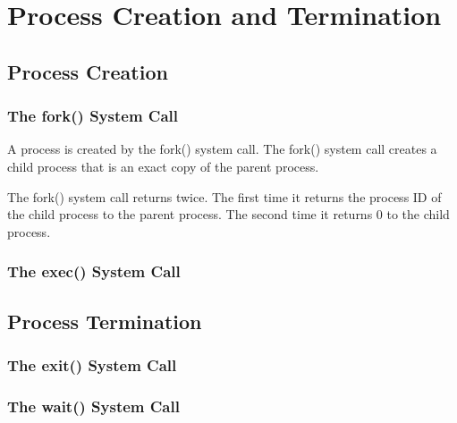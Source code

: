\section{Process Creation and Termination}
\label{sec:process-creation-and-termination}

\subsection{Process Creation}
\label{sec:process-creation}

\subsubsection{The fork() System Call}
\label{sec:the-fork-system-call}

A process is created by the fork() system call.
The fork() system call creates a child process that is an exact copy of the parent process.

The fork() system call returns twice.
The first time it returns the process ID of the child process to the parent process.
The second time it returns 0 to the child process.

\subsubsection{The exec() System Call}
\label{sec:the-exec-system-call}

\subsection{Process Termination}
\label{sec:process-termination}

\subsubsection{The exit() System Call}
\label{sec:the-exit-system-call}

\subsubsection{The wait() System Call}
\label{sec:the-wait-system-call}

